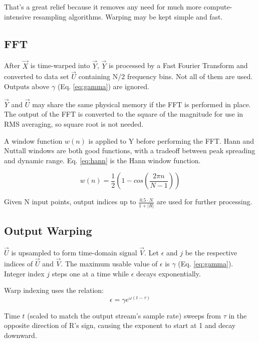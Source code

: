 That's a great relief because it removes any need for much more
compute-intensive resampling algorithms. Warping may be kept simple and fast.

\subsection{FFT}

After $\vec{X}$ is time-warped into $\vec{Y}$, $\vec{Y}$ is processed by a
Fast Fourier Transform and converted to data set $\vec{U}$ containing N/2
frequency bins. Not all of them are used.
Outputs above $\gamma$ (Eq. \ref{eq:gamma}) are ignored.

$\vec{Y}$ and $\vec{U}$ may share the
same physical memory if the FFT is performed in place.
The output of the FFT is converted to the square of the magnitude for use in
RMS averaging, so square root is not needed.

A window function $w(n)$ is applied to Y before performing the FFT.
Hann and Nuttall windows are both good functions, with a tradeoff between
peak spreading and dynamic range.
Eq. \ref{eq:hann} is the Hann window function.

\begin{equation} \label{eq:hann}
w(n) = \frac{1}{2}\left(1 - cos\left( \frac{2\pi n}{N-1} \right)\right)
\end{equation}

Given N input points, output indices up to $\frac {0.5 \cdot N}{1 + |R|}$
are used for further processing.


\subsection{Output Warping}

$\vec{U}$ is upsampled to form time-domain signal $\vec{V}$.
Let $\epsilon$ and $j$ be the respective indices of $\vec{U}$ and $\vec{V}$.
The maximum usable value of $\epsilon$ is $\gamma$ (Eq. \ref{eq:gamma}).
Integer index $j$ steps one at a time while $\epsilon$ decays exponentially.

Warp indexing uses the relation:
\begin{equation}
\epsilon = \gamma e^{\omega(t - \tau)}
\end{equation}

Time $t$ (scaled to match the output stream's sample rate) sweeps from $\tau$
in the opposite direction of R's sign,
causing the exponent to start at 1 and decay downward.

